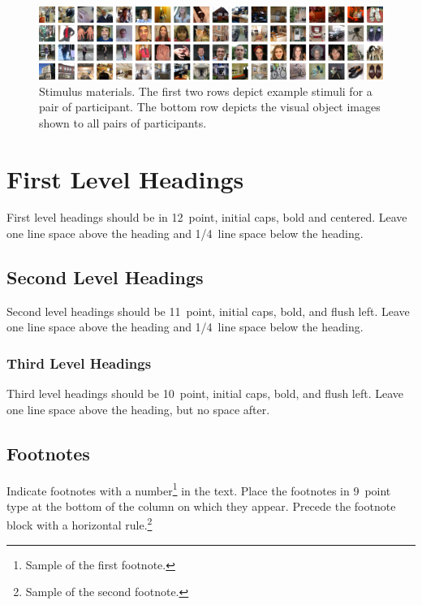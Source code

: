 \documentclass[10pt,letterpaper]{article}
\begin{document}
\begin{figure}[t]
\begin{center}
\includegraphics[width=\linewidth]{figures/figure1.png}
\end{center}
\caption{
  Stimulus materials. The first two rows depict example 
  stimuli for a pair of participant. The bottom row depicts the 
  visual object images shown to all pairs of participants.
} 
\label{sample-figure}
\end{figure}

\section{First Level Headings}

First level headings should be in 12~point, initial caps, bold and
centered. Leave one line space above the heading and 1/4~line space
below the heading.


\subsection{Second Level Headings}

Second level headings should be 11~point, initial caps, bold, and
flush left. Leave one line space above the heading and 1/4~line
space below the heading.


\subsubsection{Third Level Headings}

Third level headings should be 10~point, initial caps, bold, and flush
left. Leave one line space above the heading, but no space after.




\subsection{Footnotes}

Indicate footnotes with a number\footnote{Sample of the first
footnote.} in the text. Place the footnotes in 9~point type at the
bottom of the column on which they appear. Precede the footnote block
with a horizontal rule.\footnote{Sample of the second footnote.}
\end{document}
